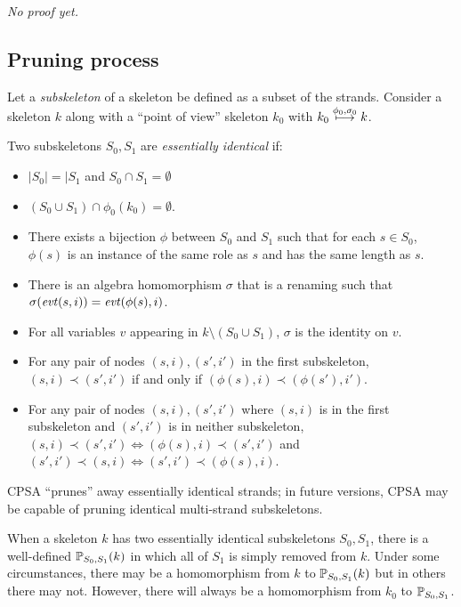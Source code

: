 \documentclass[12pt]{article}
\theoremstyle{definition}
\newcommand{\evt}{\fn{evt}}
\newcommand{\skel}{\mathsf{k}}
\begin{document}
{\em No proof yet.}

\subsection{Pruning process}

Let a {\em subskeleton} of a skeleton be defined as a subset of
the strands.  Consider a skeleton $k$ along with a ``point of view''
skeleton $k_0$ with $k_0 \stackrel{\phi_0,\sigma_0}{\longmapsto} k$.

Two subskeletons $S_0, S_1$ are {\em essentially identical} if:

\begin{itemize}
\item $|S_0| = |S_1$ and $S_0 \cap S_1 = \emptyset$
\item $(S_0 \cup S_1) \cap \phi_0(k_0) = \emptyset$.
\item There exists a bijection $\phi$ between $S_0$ and $S_1$
such that for each $s \in S_0$, $\phi(s)$ is an instance of the same
role as $s$ and has the same length as $s$.
\item There is an algebra homomorphism $\sigma$ that is a renaming
such that $\sigma(\evt(s,i)) = \evt(\phi(s),i)$.
\item For all variables $v$ appearing in $k \setminus (S_0 \cup S_1)$,
$\sigma$ is the identity on $v$.
\item For any pair of nodes $(s,i), (s',i')$ in the first subskeleton,
$(s,i) \prec (s',i')$ if and only if $(\phi(s),i) \prec (\phi(s'),i')$.
\item For any pair of nodes $(s,i), (s',i')$ where $(s,i)$ is in the first
subskeleton and $(s', i')$ is in neither subskeleton, $(s,i) \prec (s',i')
\Leftrightarrow (\phi(s),i) \prec (s',i')$ and $(s',i') \prec (s,i)
\Leftrightarrow (s',i') \prec (\phi(s),i)$.
\end{itemize}

CPSA ``prunes'' away essentially identical strands; in future
versions, CPSA may be capable of pruning identical multi-strand subskeletons.

When a skeleton $k$ has two essentially identical subskeletons $S_0, S_1$,
there is a well-defined $\mathbb P_{S_0,S_1}(k)$ in which all of $S_1$ is
simply removed from $k$.  Under some circumstances, there may be a homomorphism
from $k$ to $\mathbb P_{S_0,S_1}(k)$ but in others there may not.  However, there
will always be a homomorphism from $k_0$ to $\mathbb P_{S_0,S_1}$.

\end{document}
